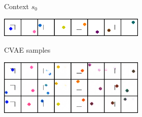 
\begin{figure}[b]
    \centering
    \vspace{-0.5cm}
    \begin{subfigure}[b]{0.49\textwidth}
        \begin{subfigure}[b]{0.4\textwidth}
            \center
            Context $s_0$ \vspace{0.2cm}
        \end{subfigure}
        \begin{subfigure}[b]{0.59\textwidth}
             {
                \includegraphics[width=1.7\linewidth]{ccrig/img/cvae_samples/wall_pointmass1_x0.png}
            }
        \end{subfigure}

        \vspace{0.1cm}

        \begin{subfigure}[b]{0.4\textwidth}
            \center
            CVAE samples \vspace{1cm}
        \end{subfigure}
        \begin{subfigure}[b]{0.59\textwidth}
             {
                \includegraphics[width=1.7\linewidth]{ccrig/img/cvae_samples/wall_pointmass1_cvae_samples.png}
            }
        \end{subfigure}

        \vspace{0.1cm}


\end{subfigure}
\end{figure}
